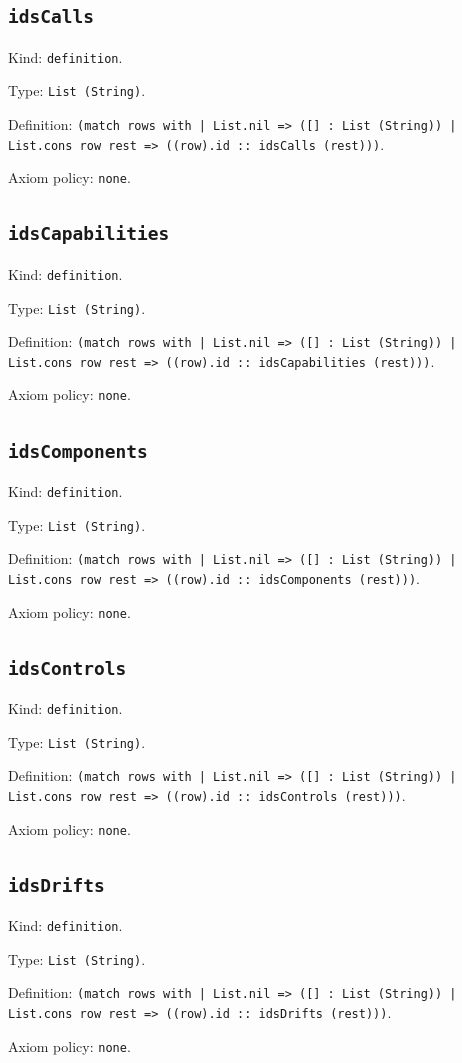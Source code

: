 \documentclass[11pt]{article}
\begin{document}
\subsection*{\texttt{idsCalls}}
\noindent Kind: \texttt{definition}.\par
\noindent Type: \texttt{List (String)}.\par
\noindent Definition: \texttt{(match rows with | List.nil => ([] : List (String)) | List.cons row rest => ((row).id :: idsCalls (rest)))}.\par
\noindent Axiom policy: \texttt{none}.\par
\subsection*{\texttt{idsCapabilities}}
\noindent Kind: \texttt{definition}.\par
\noindent Type: \texttt{List (String)}.\par
\noindent Definition: \texttt{(match rows with | List.nil => ([] : List (String)) | List.cons row rest => ((row).id :: idsCapabilities (rest)))}.\par
\noindent Axiom policy: \texttt{none}.\par
\subsection*{\texttt{idsComponents}}
\noindent Kind: \texttt{definition}.\par
\noindent Type: \texttt{List (String)}.\par
\noindent Definition: \texttt{(match rows with | List.nil => ([] : List (String)) | List.cons row rest => ((row).id :: idsComponents (rest)))}.\par
\noindent Axiom policy: \texttt{none}.\par
\subsection*{\texttt{idsControls}}
\noindent Kind: \texttt{definition}.\par
\noindent Type: \texttt{List (String)}.\par
\noindent Definition: \texttt{(match rows with | List.nil => ([] : List (String)) | List.cons row rest => ((row).id :: idsControls (rest)))}.\par
\noindent Axiom policy: \texttt{none}.\par
\subsection*{\texttt{idsDrifts}}
\noindent Kind: \texttt{definition}.\par
\noindent Type: \texttt{List (String)}.\par
\noindent Definition: \texttt{(match rows with | List.nil => ([] : List (String)) | List.cons row rest => ((row).id :: idsDrifts (rest)))}.\par
\noindent Axiom policy: \texttt{none}.\par
\end{document}

